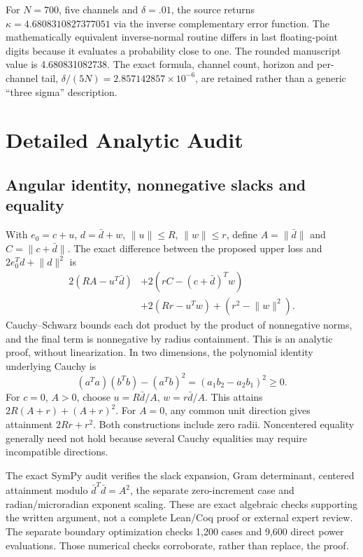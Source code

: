 \documentclass[10pt,journal]{IEEEtran}
\newcommand{\norm}[1]{\lVert#1\rVert}
\begin{document}
For $N=700$, five channels and $\delta=.01$, the source returns $\kappa=4.6808310827377051$ via the inverse complementary error function. The mathematically equivalent inverse-normal routine differs in last floating-point digits because it evaluates a probability close to one. The rounded manuscript value is 4.680831082738. The exact formula, channel count, horizon and per-channel tail, $\delta/(5N)=2.857142857\times10^{-6}$, are retained rather than a generic ``three sigma'' description.

\section{Detailed Analytic Audit}
\subsection{Angular identity, nonnegative slacks and equality}
With $e_0=c+u$, $d=\bar d+w$, $\norm u\leq R$, $\norm w\leq r$, define $A=\norm{\bar d}$ and $C=\norm{c+\bar d}$. The exact difference between the proposed upper loss and $2e_0^Td+\norm d^2$ is
\begin{align}
2(RA-u^T\bar d)&+2(rC-(c+\bar d)^Tw)\nonumber\\
&+2(Rr-u^Tw)+(r^2-\norm w^2).
\end{align}
Cauchy--Schwarz bounds each dot product by the product of nonnegative norms, and the final term is nonnegative by radius containment. This is an analytic proof, without linearization. In two dimensions, the polynomial identity underlying Cauchy is
\begin{equation}
(a^Ta)(b^Tb)-(a^Tb)^2=(a_1b_2-a_2b_1)^2\geq0.
\end{equation}
For $c=0$, $A>0$, choose $u=R\bar d/A$, $w=r\bar d/A$. This attains $2R(A+r)+(A+r)^2$. For $A=0$, any common unit direction gives attainment $2Rr+r^2$. Both constructions include zero radii. Noncentered equality generally need not hold because several Cauchy equalities may require incompatible directions.

The exact SymPy audit verifies the slack expansion, Gram determinant, centered attainment modulo $\bar d^T\bar d=A^2$, the separate zero-increment case and radian/microradian exponent scaling. These are exact algebraic checks supporting the written argument, not a complete Lean/Coq proof or external expert review. The separate boundary optimization checks 1,200 cases and 9,600 direct power evaluations. Those numerical checks corroborate, rather than replace, the proof.
\end{document}
